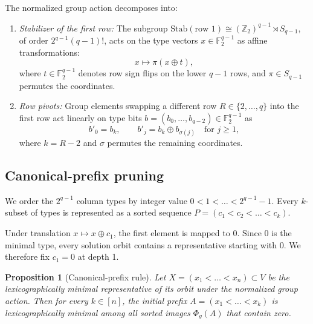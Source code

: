 \documentclass[11pt]{article}
\theoremstyle{plain}
\newtheorem{proposition}[theorem]{Proposition}
\theoremstyle{definition}
\begin{document}
The normalized group action decomposes into:
\begin{enumerate}[label=(\alph*)]
\item \emph{Stabilizer of the first row:} The subgroup $\mathrm{Stab}(\text{row 1}) \cong (\mathbb{Z}_2)^{q-1} \rtimes S_{q-1}$, of order $2^{q-1}(q-1)!$, acts on the type vectors $x \in \mathbb{F}_2^{q-1}$ as affine transformations:
\[
  x \longmapsto \pi(x \oplus t),
\]
where $t \in \mathbb{F}_2^{q-1}$ denotes row sign flips on the lower $q-1$ rows, and $\pi \in S_{q-1}$ permutes the coordinates.
\item \emph{Row pivots:} Group elements swapping a different row $R \in \{2,\dots,q\}$ into the first row act linearly on type bits $b = (b_0,\dots,b_{q-2}) \in \mathbb{F}_2^{q-1}$ as
\[
  b'_0 = b_k, \qquad b'_j = b_k \oplus b_{\sigma(j)} \quad \text{for } j \ge 1,
\]
where $k = R - 2$ and $\sigma$ permutes the remaining coordinates.
\end{enumerate}

\subsection{Canonical-prefix pruning}

We order the $2^{q-1}$ column types by integer value $0 < 1 < \dots < 2^{q-1}-1$. Every $k$-subset of types is represented as a sorted sequence $P = (c_1 < c_2 < \dots < c_k)$.

Under translation $x \mapsto x \oplus c_1$, the first element is mapped to $0$. Since $0$ is the minimal type, every solution orbit contains a representative starting with $0$. We therefore fix $c_1 = 0$ at depth 1.

\begin{proposition}[Canonical-prefix rule]\label{prop:prefix}
Let $X = (x_1 < \dots < x_n) \subset V$ be the lexicographically minimal representative of its orbit under the normalized group action. Then for every $k \in [n]$, the initial prefix $A = (x_1 < \dots < x_k)$ is lexicographically minimal among all sorted images $\Phi_g(A)$ that contain zero.
\end{proposition}
\end{document}
